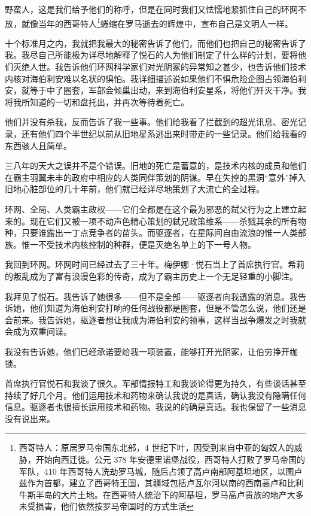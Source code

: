 \documentclass[AutoFakeBold=true]{book}
\begin{document}
{野蛮人，这是我们给予他们的称呼，但是在同时我们又怯懦地紧抓住自己的环网不放，就像当年的西哥特人\footnote{西哥特人：原居罗马帝国东北部，4 世纪下叶，因受到来自中亚的匈奴人的威胁，开始向西迁徙。公元 378 年安德里诺堡战役，西哥特人打败了罗马帝国的军队，410 年西哥特人洗劫罗马城，随后占领了高卢南部阿基坦地区，以图卢兹作为首都，建立了西哥特王国，其疆域包括卢瓦尔河以南的西南高卢和比利牛斯半岛的大片土地。在西哥特人统治下的阿基坦，罗马高卢贵族的地产大多未受损害，他们依然按罗马帝国时的方式生活}蜷缩在罗马逝去的辉煌中，宣布自己是文明人一样。

十个标准月之内，我就把我最大的秘密告诉了他们，而他们也把自己的秘密告诉了我。我尽自己所能极为详尽地解释了悦石的人为他们制定了什么样的计划，要将他们灭绝人世。我告诉他们环网科学家们对光阴冢的异常知之甚少，也告诉他们技术内核对海伯利安难以名状的惧怕。我详细描述说如果他们不惧危险企图占领海伯利安，就等于中了圈套，军部会倾巢出动，来到海伯利安星系，将他们歼灭干净。我将我所知道的一切和盘托出，并再次等待着死亡。

他们并没有杀我，反而告诉了我一些事。他们给我看了拦截到的超光讯息、密光记录，还有他们四个半世纪以前从旧地星系逃出来时带走的一些记录。他们给我看的东西骇人且简单。

三八年的天大之误并不是个错误。旧地的死亡是蓄意的，是技术内核的成员和他们在霸主羽翼未丰的政府中相应的人类同伴策划的阴谋。早在失控的黑洞``意外''掉入旧地心脏部位的几十年前，他们就已经详尽地策划了大流亡的全过程。

环网、全局、人类霸主政权——它们全都是在这个最为邪恶的弑父行为之上建立起来的。现在它们又被一项不动声色精心策划的弑兄政策维系——杀戮其余的所有物种，只要谁露出一丁点竞争者的苗头。而驱逐者，在星际间自由流浪的惟一人类部族。惟一不受技术内核控制的种群，便是灭绝名单上的下一号人物。

我回到环网。环网时间已经过去了三十年。梅伊娜·悦石当上了首席执行官。希莉的叛乱成为了富有浪漫色彩的传奇，成为了霸主历史上一个无足轻重的小脚注。

我拜见了悦石。我告诉了她很多——但不是全部——驱逐者向我透露的消息。我告诉她，他们知道为海伯利安打响的任何战役都是圈套，但是不管怎么说，他们还是会前来。我告诉她，驱逐者想让我成为海伯利安的领事，这样当战争爆发之时我就会成为双重间谍。

我没有告诉她，他们已经承诺要给我一项装置，能够打开光阴冢，让伯劳挣开枷锁。

首席执行官悦石和我谈了很久。军部情报特工和我谈论得更为持久，有些谈话甚至持续了好几个月。他们运用技术和药物来确认我说的是真话，确认我没有隐瞒任何信息。驱逐者也很擅长运用技术和药物。我说的的确是真话。我也保留了一些消息没有说出来。

}
\end{document}
